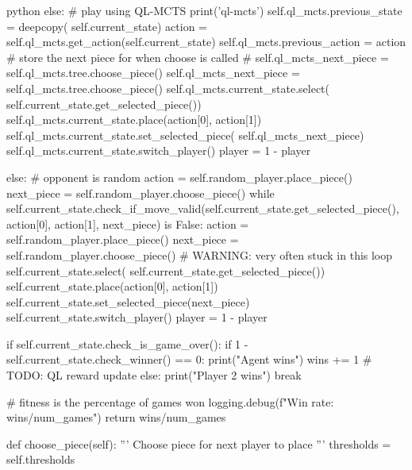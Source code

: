 \begin{mintedbox}{python}
                    else:
                        # play using QL-MCTS
                        print('ql-mcts')
                        self.ql_mcts.previous_state = deepcopy(
                            self.current_state)
                        action = self.ql_mcts.get_action(self.current_state)
                        self.ql_mcts.previous_action = action
                        # store the next piece for when choose is called
                        # self.ql_mcts_next_piece = self.ql_mcts.tree.choose_piece()
                        self.ql_mcts_next_piece = self.ql_mcts.tree.choose_piece()
                        self.ql_mcts.current_state.select(
                            self.current_state.get_selected_piece())
                        self.ql_mcts.current_state.place(action[0], action[1])
                        self.ql_mcts.current_state.set_selected_piece(
                            self.ql_mcts_next_piece)
                        self.ql_mcts.current_state.switch_player()
                        player = 1 - player

                else:
                    # opponent is random
                    action = self.random_player.place_piece()
                    next_piece = self.random_player.choose_piece()
                    while self.current_state.check_if_move_valid(self.current_state.get_selected_piece(), action[0], action[1], next_piece) is False:
                        action = self.random_player.place_piece()
                        next_piece = self.random_player.choose_piece()
                        # WARNING: very often stuck in this loop
                    self.current_state.select(
                        self.current_state.get_selected_piece())
                    self.current_state.place(action[0], action[1])
                    self.current_state.set_selected_piece(next_piece)
                    self.current_state.switch_player()
                    player = 1 - player

                if self.current_state.check_is_game_over():
                    if 1 - self.current_state.check_winner() == 0:
                        print("Agent wins")
                        wins += 1
                        # TODO: QL reward update
                    else:
                        print("Player 2 wins")
                    break

        # fitness is the percentage of games won
        logging.debug(f"Win rate: {wins/num_games}")
        return wins/num_games

    def choose_piece(self):
        '''
        Choose piece for next player to place
        '''
        thresholds = self.thresholds


\end{mintedbox}
